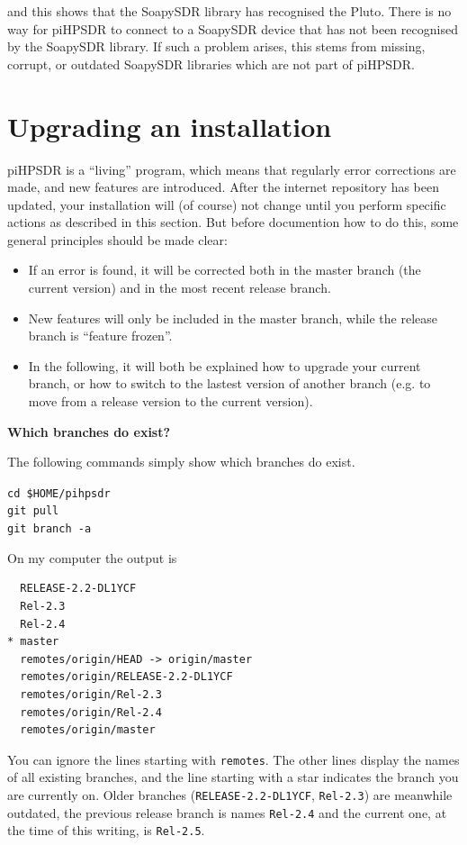 \documentclass[12pt]{book}
\def\grtt#1{\texttt{\color{magenta}#1}}
\def\pH{pi\-HPSDR\xspace}
\begin{document}
and this shows that the SoapySDR library has recognised the Pluto.
There is no way for \pH to connect
to a SoapySDR device that has not been recognised by the SoapySDR library. If such a problem arises, this
stems from missing, corrupt, or outdated SoapySDR libraries which are not part of \pH.

\section{Upgrading an installation}
\pH is a ``living'' program, which means that regularly  error corrections are made, and new features are
introduced. After the internet repository has been updated, your installation will (of course) not change
until you perform specific actions as described in this section. But before documention how to do this,
some general principles should be made clear:

\begin{itemize}
\item{If an error is found, it will be corrected both in the master branch (the current version) and in the
most recent release branch.}
\item{New features will only be included in the master branch, while the release branch is ``feature frozen''.}
\item{In the following, it will both be explained how to upgrade your current branch, or how to
switch to the lastest version of  another branch (e.g. to move from a release version to the current version).}
\end{itemize}

\textbf{Which branches do exist?}

The following commands simply show which branches do exist.

\grtt{cd \$HOME/pihpsdr} \\
\grtt{git pull} \\
\grtt{git branch -a}

On my computer the output is

\begin{verbatim}
  RELEASE-2.2-DL1YCF
  Rel-2.3
  Rel-2.4
* master
  remotes/origin/HEAD -> origin/master
  remotes/origin/RELEASE-2.2-DL1YCF
  remotes/origin/Rel-2.3
  remotes/origin/Rel-2.4
  remotes/origin/master
\end{verbatim}

You can ignore the  lines starting with \texttt{remotes}. The other lines display the names of all
existing branches, and the line starting with a star indicates the branch you are currently on.
Older branches (\texttt{RELEASE-2.2-DL1YCF}, \texttt{Rel-2.3}) are meanwhile outdated, the previous
release branch is names \texttt{Rel-2.4} and the current one, at the time of this writing, is \texttt{Rel-2.5}.
\end{document}
